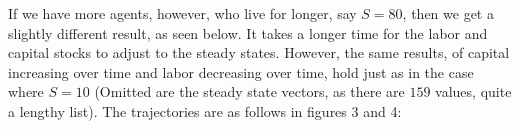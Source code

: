 \documentclass[letterpaper,12pt]{article}
\theoremstyle{definition}
\begin{document}
If we have more agents, however, who live for longer, say $S = 80$, then we get a slightly different result, as seen below. It takes a longer time for the labor and capital stocks to adjust to the steady states. However, the same results, of capital increasing over time and labor decreasing over time, hold just as in the case where $S = 10$ (Omitted are the steady state vectors, as there are $159$ values, quite a lengthy list). The trajectories are as follows in figures 3 and 4:
\end{document}
